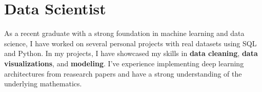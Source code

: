 
\section{Data Scientist}
\small{
    As a recent graduate with a strong foundation in machine learning and data science, I have worked on several personal projects with real datasets using SQL and Python. In my projects, I have showcased my skills in \textbf{data cleaning}, \textbf{data visualizations}, and \textbf{modeling}. I've experience implementing deep learning architectures from reasearch papers and have a strong understanding of the underlying mathematics.
}
